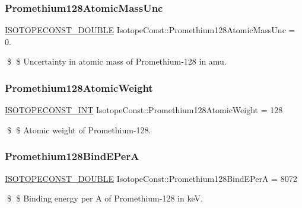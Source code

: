 \subsubsection{\texorpdfstring{Promethium128\+Atomic\+Mass\+Unc}{Promethium128AtomicMassUnc}}
{\footnotesize\ttfamily \mbox{\hyperlink{group___isotope_const-_macros_ga8f45a7272ce02c0b4c65c44636ed719a}{I\+S\+O\+T\+O\+P\+E\+C\+O\+N\+S\+T\+\_\+\+D\+O\+U\+B\+LE}} Isotope\+Const\+::\+Promethium128\+Atomic\+Mass\+Unc = 0.}

\$ \$ Uncertainty in atomic mass of Promethium-\/128 in amu. \mbox{\label{group___isotope_const-_promethium-_pm128_ga024e927ef36c85a04059628036e5d343}} 
\subsubsection{\texorpdfstring{Promethium128\+Atomic\+Weight}{Promethium128AtomicWeight}}
{\footnotesize\ttfamily \mbox{\hyperlink{group___isotope_const-_macros_ga5f18360b3e99483a35c32d789e62621c}{I\+S\+O\+T\+O\+P\+E\+C\+O\+N\+S\+T\+\_\+\+I\+NT}} Isotope\+Const\+::\+Promethium128\+Atomic\+Weight = 128}

\$ \$ Atomic weight of Promethium-\/128. \mbox{\label{group___isotope_const-_promethium-_pm128_gaaca23352fedcbc7ee082442598e4b3b7}} 
\subsubsection{\texorpdfstring{Promethium128\+Bind\+E\+PerA}{Promethium128BindEPerA}}
{\footnotesize\ttfamily \mbox{\hyperlink{group___isotope_const-_macros_ga8f45a7272ce02c0b4c65c44636ed719a}{I\+S\+O\+T\+O\+P\+E\+C\+O\+N\+S\+T\+\_\+\+D\+O\+U\+B\+LE}} Isotope\+Const\+::\+Promethium128\+Bind\+E\+PerA = 8072}

\$ \$ Binding energy per A of Promethium-\/128 in keV. \mbox{\label{group___isotope_const-_promethium-_pm128_ga9c7b4384577f17a6315ab1aa72cb6f0c}} 

